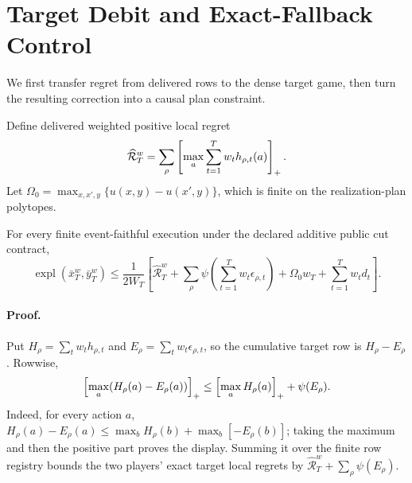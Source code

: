 \section{Target Debit and Exact-Fallback Control}
\label{sec:theory}

We first transfer regret from delivered rows to the dense target game, then
turn the resulting correction into a causal plan constraint.

Define delivered weighted positive local regret
\begin{equation}
\widehat{\mathcal R}_T^w=
\sum_\rho\left[\max_a\sum_{t=1}^T w_t h_{\rho,t}(a)\right]_+.
\label{eq:delivered-positive-regret}
\end{equation}
Let
$\Omega_0=\max_{x,x',y}\{u(x,y)-u(x',y)\}$, which is finite on the
realization-plan polytopes.

\begin{theorem}
\label{thm:weighted-target-debit}
For every finite event-faithful execution under the declared additive public
cut contract,
\begin{equation}
\boxed{
\operatorname{expl}(\bar x_T^w,\bar y_T^w)
\le\frac{1}{2W_T}\left[
\widehat{\mathcal R}_T^w
+\sum_\rho\psi\!\left(\sum_{t=1}^T w_t\epsilon_{\rho,t}\right)
+\Omega_0w_T+\sum_{t=1}^T w_td_t
\right].}
\label{eq:weighted-target-debit}
\end{equation}
\end{theorem}

\paragraph{Proof.}
Put $H_\rho=\sum_t w_th_{\rho,t}$ and
$E_\rho=\sum_t w_t\epsilon_{\rho,t}$, so the cumulative target row is
$H_\rho-E_\rho$.  Rowwise,
\begin{equation}
\left[\max_a(H_\rho(a)-E_\rho(a))\right]_+
\le \left[\max_a H_\rho(a)\right]_++\psi(E_\rho).
\label{eq:one-sided-row-transfer}
\end{equation}
Indeed, for every action $a$,
$H_\rho(a)-E_\rho(a)\le\max_bH_\rho(b)+\max_b[-E_\rho(b)]$;
taking the maximum and then the positive part proves the display.  Summing it
over the finite row registry bounds the two players' exact target local
regrets by $\widehat{\mathcal R}_T^w+\sum_\rho\psi(E_\rho)$.

